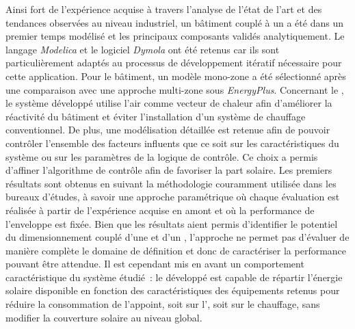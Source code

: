 Ainsi fort de l’expérience acquise à travers l’analyse de l’état de l’art et des tendances
observées au niveau industriel, un bâtiment couplé à un  a été dans un premier temps
modélisé et les principaux composants validés analytiquement. Le langage \textit{Modelica}
et le logiciel \textit{Dymola} ont été retenus car ils sont particulièrement adaptés au
processus de développement itératif nécessaire pour cette application. Pour le bâtiment,
un modèle mono-zone a été sélectionné après une comparaison avec une approche multi-zone
sous \textit{EnergyPlus}. Concernant le , le système développé utilise l’air
comme vecteur de chaleur afin d’améliorer la réactivité du bâtiment et éviter
l’installation d’un système de chauffage conventionnel. De plus, une modélisation détaillée
est retenue afin de pouvoir contrôler l’ensemble des facteurs
influents que ce soit sur les caractéristiques du système ou sur les paramètres de la
logique de contrôle. Ce choix a permis d’affiner l’algorithme de contrôle afin de
favoriser la part solaire. Les
premiers résultats sont obtenus en suivant la méthodologie couramment utilisée dans les
bureaux d’études, à savoir une approche paramétrique où chaque évaluation est réalisée
à partir de l’expérience acquise en amont et où la performance de l’enveloppe est fixée. Bien que les
résultats aient permis d’identifier le potentiel du dimensionnement couplé d’une  et d’un
, l’approche ne permet pas d’évaluer de manière complète le domaine de
définition et donc de caractériser la performance pouvant être attendue.
Il est cependant mis en avant
un comportement caractéristique du système étudié~: le  développé est capable de
répartir l’énergie solaire disponible en fonction des caractéristiques des équipements
retenus pour réduire la consommation de l’appoint, soit sur l’, soit sur le chauffage,
sans modifier la couverture solaire au niveau global.

